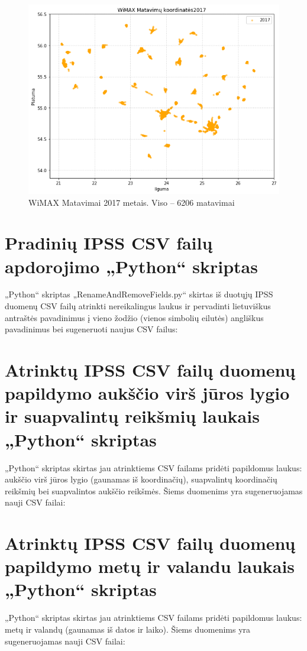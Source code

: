 \documentclass{VUMIFPSbakalaurinis}
\begin{document}
\begin{figure}[H]
	\centering
	\includegraphics[scale=0.5]{img/WiMAX-3}
	\caption{WiMAX Matavimai 2017 metais. Viso – 6206 matavimai}
	\label{img:WiMAX-3}
\end{figure}

\section{Pradinių IPSS CSV failų apdorojimo „Python“ skriptas} \label{script1}
„Python“ skriptas „RenameAndRemoveFields.py“ skirtas iš duotųjų IPSS duomenų CSV failų atrinkti nereikalingus laukus ir pervadinti lietuviškus antraštės pavadinimus į vieno žodžio (vienos simbolių eilutės) angliškus pavadinimus bei sugeneruoti naujus CSV failus:


\section{Atrinktų IPSS CSV failų duomenų papildymo aukščio virš jūros lygio ir suapvalintų reikšmių laukais „Python“ skriptas} \label{script2}
„Python“ skriptas skirtas jau atrinktiems CSV failams pridėti papildomus laukus: aukščio virš jūros lygio (gaunamas iš koordinačių), suapvalintų koordinačių reikšmių bei suapvalintos aukščio reikšmės. Šiems duomenims yra sugeneruojamas nauji CSV failai:


\section{Atrinktų IPSS CSV failų duomenų papildymo metų ir valandu laukais „Python“ skriptas} \label{script3}
„Python“ skriptas skirtas jau atrinktiems CSV failams pridėti papildomus laukus: metų ir valandų (gaunamas iš datos ir laiko). Šiems duomenims yra sugeneruojamas nauji CSV failai:

\end{document}
